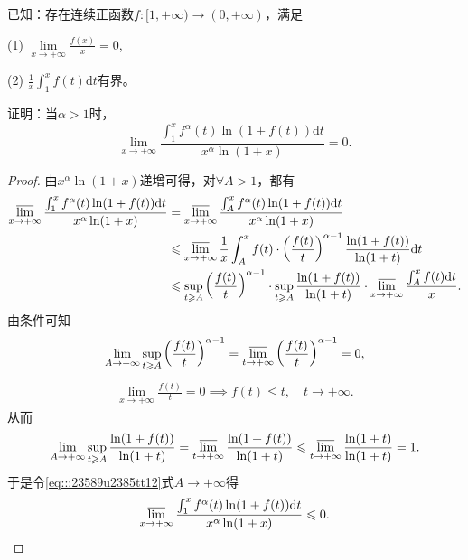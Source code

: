 \documentclass[../../main.tex]{subfiles}%
\begin{document}
\begin{example}
已知：存在连续正函数\( f : [1, +\infty) \to (0, +\infty) \)，满足

(1) \( \lim\limits_{x \to +\infty} \frac{f(x)}{x} = 0 \),

(2) \( \frac{1}{x} \int_1^x f(t)\mathrm{d}t \)有界。

证明：当\( \alpha > 1 \)时，
\[
\lim_{x \to +\infty} \frac{\int_1^x f^\alpha(t) \ln(1 + f(t))\mathrm{d}t}{x^\alpha \ln(1 + x)} = 0.
\]
\end{example}
\begin{proof}

由\( x^{\alpha}\ln(1 + x) \)递增可得，对\( \forall A > 1 \)，都有
\begin{align}
\varlimsup_{x \to +\infty} \frac{\int_1^x f^{\alpha}(t)\ln(1 + f(t))\mathrm{d}t}{x^{\alpha}\ln(1 + x)} &= \varlimsup_{x \to +\infty} \frac{\int_A^x f^{\alpha}(t)\ln(1 + f(t))\mathrm{d}t}{x^{\alpha}\ln(1 + x)}  \nonumber \\
&\leqslant \varlimsup_{x \to +\infty} \frac{1}{x} \int_A^x f(t) \cdot \left( \frac{f(t)}{t} \right)^{\alpha - 1} \frac{\ln(1 + f(t))}{\ln(1 + t)}\mathrm{d}t \nonumber \\
&\leqslant \sup_{t \geqslant A} \left( \frac{f(t)}{t} \right)^{\alpha - 1} \cdot \sup_{t \geqslant A} \frac{\ln(1 + f(t))}{\ln(1 + t)} \cdot \varlimsup_{x \to +\infty} \frac{\int_A^x f(t)\mathrm{d}t}{x}. \label{eq:::23589u2385tt12}
\end{align}
由条件可知
\begin{align*}
\lim_{A \to +\infty} \sup_{t \geqslant A} \left( \frac{f(t)}{t} \right)^{\alpha - 1} = \varlimsup_{t \to +\infty} \left( \frac{f(t)}{t} \right)^{\alpha - 1} = 0,
\end{align*}
\begin{align*}
\lim_{x \to +\infty} \frac{f(t)}{t} = 0 \implies f(t) \leqslant t, \quad t \to +\infty.
\end{align*}
从而
\begin{align*}
\lim_{A \to +\infty} \sup_{t \geqslant A} \frac{\ln(1 + f(t))}{\ln(1 + t)} = \varlimsup_{t \to +\infty} \frac{\ln(1 + f(t))}{\ln(1 + t)} \leqslant \varlimsup_{t \to +\infty} \frac{\ln(1 + t)}{\ln(1 + t)} = 1.
\end{align*}
于是令\eqref{eq:::23589u2385tt12}式\( A \to +\infty \)得
\begin{align*}
\varlimsup_{x \to +\infty} \frac{\int_1^x f^{\alpha}(t)\ln(1 + f(t))\mathrm{d}t}{x^{\alpha}\ln(1 + x)} \leqslant 0.
\end{align*}

\end{proof}
\end{document}
